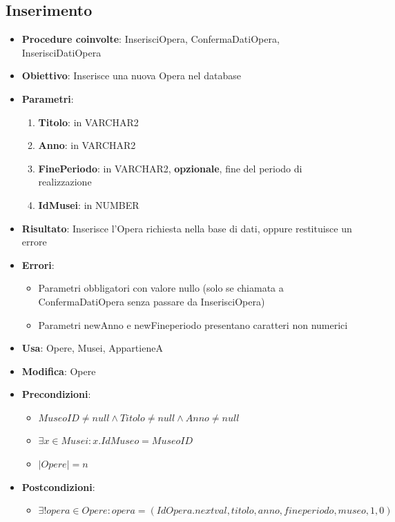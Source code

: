\subsection{Inserimento}
\begin{itemize}
	\item \textbf{Procedure coinvolte}: InserisciOpera, ConfermaDatiOpera, InserisciDatiOpera
	\item \textbf{Obiettivo}: Inserisce una nuova Opera nel database
	\item \textbf{Parametri}:
	\begin{enumerate}
		\item \textbf{Titolo}: in VARCHAR2
		\item \textbf{Anno}: in VARCHAR2
		\item \textbf{FinePeriodo}: in VARCHAR2, \textbf{opzionale}, fine del periodo di realizzazione 
		\item \textbf{IdMusei}: in NUMBER
	\end{enumerate}
	\item \textbf{Risultato}: Inserisce l'Opera richiesta nella base di dati, oppure restituisce un errore
	\item \textbf{Errori}: 
	\begin{itemize}
		\item Parametri obbligatori con valore nullo (solo se chiamata a ConfermaDatiOpera senza passare da InserisciOpera)
		\item Parametri newAnno e newFineperiodo presentano caratteri non numerici
	\end{itemize}
	\item \textbf{Usa}: Opere, Musei, AppartieneA
	\item \textbf{Modifica}: Opere
	\item \textbf{Precondizioni}:
	\begin{itemize}
		\item $MuseoID \ne null \land Titolo \ne null \land Anno \ne null$
		\item $\exists x \in Musei : x.IdMuseo = MuseoID$
		\item $|Opere| = n$
	\end{itemize}
	\item \textbf{Postcondizioni}:
	\begin{itemize}
		\item $\exists! opera \in Opere : opera = (IdOpera.nextval, titolo, anno, fineperiodo, museo, 1, 0)$
	\end{itemize}
\end{itemize}
